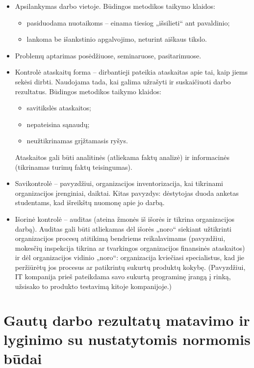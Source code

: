 \begin{itemize}
  \item Apsilankymas darbo vietoje. Būdingos metodikos taikymo
    klaidos:
    \begin{itemize}
      \item pasiduodama nuotaikoms – einama tiesiog „išsilieti“ ant
        pavaldinio;
      \item lankoma be išankstinio apgalvojimo, neturint aiškaus
        tikslo.
    \end{itemize}
  \item Problemų aptarimas posėdžiuose, seminaruose, pasitarimuose.
  \item Kontrolė ataskaitų forma – dirbantieji pateikia ataskaitas
    apie tai, kaip jiems sekėsi dirbti. Naudojama tada, kai galima
    užrašyti ir suskaičiuoti darbo rezultatus. Būdingos metodikos
    taikymo klaidos:
    \begin{itemize}
      \item savitikslės ataskaitos;
      \item nepateisina sąnaudų;
      \item neužtikrinamas grįžtamasis ryšys.
    \end{itemize}
    Ataskaitos gali būti analitinės (atliekama faktų analizė) ir
    informacinės (tikrinamas turimų faktų teisingumas).
  \item Savikontrolė – pavyzdžiui, organizacijos inventorizacija, kai
    tikrinami organizacijos įrenginiai, daiktai. Kitas pavyzdys:
    dėstytojas duoda anketas studentams, kad išreikštų nuomonę apie
    jo darbą.
  \item Išorinė kontrolė – auditas (ateina žmonės iš išorės ir tikrina
    organizacijos darbą). Auditas gali būti atliekamas dėl išorės
    „noro“ siekiant užtikrinti organizacijos procesų atitikimą
    bendriems reikalavimams (pavyzdžiui, mokesčių inspekcija tikrina
    ar tvarkingos organizacijos finansinės ataskaitos) ir dėl
    organizacijos vidinio „noro“: organizacija kviečiasi
    specialistus, kad jie peržiūrėtų jos procesus ar patikrintų
    sukurtų produktų kokybę. (Pavyzdžiui, IT kompanija prieš
    pateikdama savo sukurtą programinę įrangą į rinką, užsisako
    to produkto testavimą kitoje kompanijoje.)
\end{itemize}

\section{Gautų darbo rezultatų matavimo ir lyginimo su nustatytomis
normomis būdai}

